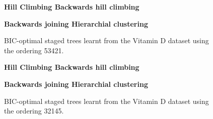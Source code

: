 \documentclass{tufte-book}
\begin{document}
\begin{figure}
   \begin{floatrow}
   \centering
   \textbf{\hspace{10mm}Hill Climbing \hspace{50mm} Backwards hill climbing}\par\medskip
{}%
\hfill
{}
   \end{floatrow}

   
      \begin{floatrow}
   \centering
   \textbf{\hspace{5mm}Backwards joining \hspace{55mm} Hierarchial clustering}\par\medskip
{}%
\hfill
{}%
   \end{floatrow}
   \caption{BIC-optimal staged trees learnt from the Vitamin D dataset using the ordering 53421.}
\end{figure}

\begin{figure}
   \begin{floatrow}
   \centering
   \textbf{\hspace{10mm}Hill Climbing \hspace{50mm} Backwards hill climbing}\par\medskip
{}%
\hfill
{}
   \end{floatrow}

   
      \begin{floatrow}
   \centering
   \textbf{\hspace{5mm}Backwards joining \hspace{55mm} Hierarchial clustering}\par\medskip
{}%
\hfill
{}%
   \end{floatrow}
   \caption{BIC-optimal staged trees learnt from the Vitamin D dataset using the ordering 32145.}
\end{figure}
\end{document}
